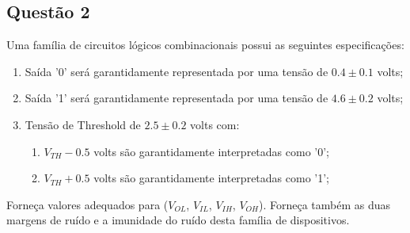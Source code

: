 \documentclass{article}
\begin{document}
\newpage
        \subsection{Questão 2}
            \begin{exercise}
                Uma família de circuitos lógicos combinacionais possui as seguintes especificações:
                    \begin{enumerate}
                        \item Saída '0' será garantidamente representada por uma tensão de $0.4 \pm 0.1$ volts;
                        \item Saída '1' será garantidamente representada por uma tensão de $4.6 \pm 0.2$ volts;
                        \item Tensão de Threshold de $2.5 \pm 0.2$ volts com:
                            \begin{enumerate}[noitemsep]
                                \item $V_{TH}-0.5$ volts são garantidamente interpretadas como '0';
                                \item $V_{TH}+0.5$ volts são garantidamente interpretadas como '1';
                            \end{enumerate}
                    \end{enumerate}
                Forneça valores adequados para ($V_{OL}$, $V_{IL}$, $V_{IH}$, $V_{OH}$). Forneça também as duas margens de ruído e a imunidade do ruído desta família de dispositivos.
            \end{exercise}
\end{document}
